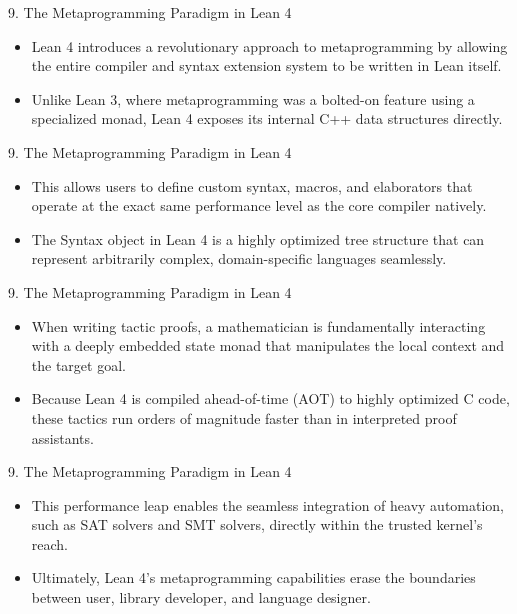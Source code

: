 \documentclass[10pt]{beamer}
\begin{document}
\begin{frame}{9. The Metaprogramming Paradigm in Lean 4}
\begin{itemize}\setlength{\itemsep}{1.5em}
  \item Lean 4 introduces a revolutionary approach to metaprogramming by allowing the entire compiler and syntax extension system to be written in Lean itself.
  \item Unlike Lean 3, where metaprogramming was a bolted-on feature using a specialized monad, Lean 4 exposes its internal C++ data structures directly.
\end{itemize}
\end{frame}

\begin{frame}{9. The Metaprogramming Paradigm in Lean 4}
\begin{itemize}\setlength{\itemsep}{1.5em}
  \item This allows users to define custom syntax, macros, and elaborators that operate at the exact same performance level as the core compiler natively.
  \item The Syntax object in Lean 4 is a highly optimized tree structure that can represent arbitrarily complex, domain-specific languages seamlessly.
\end{itemize}
\end{frame}

\begin{frame}{9. The Metaprogramming Paradigm in Lean 4}
\begin{itemize}\setlength{\itemsep}{1.5em}
  \item When writing tactic proofs, a mathematician is fundamentally interacting with a deeply embedded state monad that manipulates the local context and the target goal.
  \item Because Lean 4 is compiled ahead-of-time (AOT) to highly optimized C code, these tactics run orders of magnitude faster than in interpreted proof assistants.
\end{itemize}
\end{frame}

\begin{frame}{9. The Metaprogramming Paradigm in Lean 4}
\begin{itemize}\setlength{\itemsep}{1.5em}
  \item This performance leap enables the seamless integration of heavy automation, such as SAT solvers and SMT solvers, directly within the trusted kernel's reach.
  \item Ultimately, Lean 4's metaprogramming capabilities erase the boundaries between user, library developer, and language designer.
\end{itemize}
\end{frame}
\end{document}
